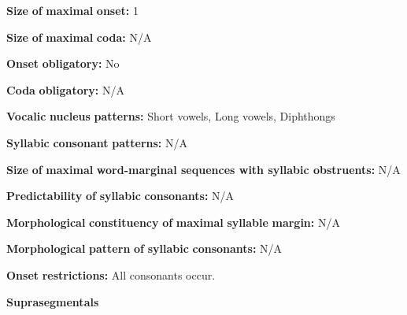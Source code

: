 \documentclass[output=paper]{langsci/langscibook}
\begin{document}
\begin{styleBody}
\textbf{Size} \textbf{of} \textbf{maximal} \textbf{onset:} 1
\end{styleBody}

\begin{styleBody}
\textbf{Size} \textbf{of} \textbf{maximal} \textbf{coda:} N/A
\end{styleBody}

\begin{styleBody}
\textbf{Onset} \textbf{obligatory:} No
\end{styleBody}

\begin{styleBody}
\textbf{Coda} \textbf{obligatory:} N/A
\end{styleBody}

\begin{styleBody}
\textbf{Vocalic} \textbf{nucleus} \textbf{patterns:} Short vowels, Long vowels, Diphthongs
\end{styleBody}

\begin{styleBody}
\textbf{Syllabic} \textbf{consonant} \textbf{patterns:} N/A
\end{styleBody}

\begin{styleBody}
\textbf{Size} \textbf{of} \textbf{maximal} \textbf{word{}-marginal sequences with syllabic obstruents:} N/A
\end{styleBody}

\begin{styleBody}
\textbf{Predictability} \textbf{of} \textbf{syllabic} \textbf{consonants:} N/A
\end{styleBody}

\begin{styleBody}
\textbf{Morphological} \textbf{constituency} \textbf{of} \textbf{maximal} \textbf{syllable} \textbf{margin:} N/A
\end{styleBody}

\begin{styleBody}
\textbf{Morphological} \textbf{pattern} \textbf{of} \textbf{syllabic} \textbf{consonants:} N/A
\end{styleBody}

\begin{styleBody}
\textbf{Onset} \textbf{restrictions:} All consonants occur.
\end{styleBody}

\begin{styleBody}
\textbf{Suprasegmentals}
\end{styleBody}
\end{document}
